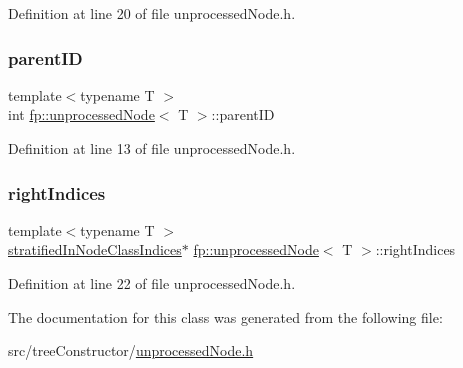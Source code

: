 Definition at line 20 of file unprocessed\+Node.\+h.

\mbox{\label{classfp_1_1unprocessedNode_a74cb75f76c24622444e531a583b75c3d}} 
\subsubsection{\texorpdfstring{parent\+ID}{parentID}}
{\footnotesize\ttfamily template$<$typename T $>$ \\
int \hyperlink{classfp_1_1unprocessedNode}{fp\+::unprocessed\+Node}$<$ T $>$\+::parent\+ID\hspace{0.3cm}{\ttfamily [protected]}}



Definition at line 13 of file unprocessed\+Node.\+h.

\mbox{\label{classfp_1_1unprocessedNode_a4e805660b305b1056cea187ed5584a1d}} 
\subsubsection{\texorpdfstring{right\+Indices}{rightIndices}}
{\footnotesize\ttfamily template$<$typename T $>$ \\
\hyperlink{classfp_1_1stratifiedInNodeClassIndices}{stratified\+In\+Node\+Class\+Indices}$\ast$ \hyperlink{classfp_1_1unprocessedNode}{fp\+::unprocessed\+Node}$<$ T $>$\+::right\+Indices\hspace{0.3cm}{\ttfamily [protected]}}



Definition at line 22 of file unprocessed\+Node.\+h.



The documentation for this class was generated from the following file\+:\begin{DoxyCompactItemize}
\item 
src/tree\+Constructor/\hyperlink{unprocessedNode_8h}{unprocessed\+Node.\+h}\end{DoxyCompactItemize}
